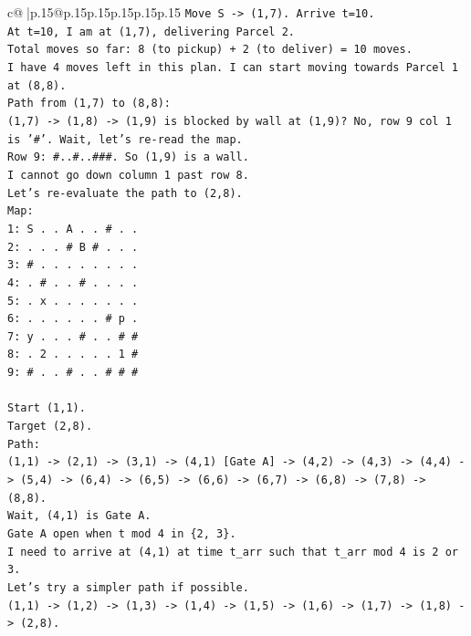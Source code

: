 \documentclass{article}
\begin{document}
{\begin{supertabular}{c@{$\;$}|p{.15\linewidth}@{}p{.15\linewidth}p{.15\linewidth}p{.15\linewidth}p{.15\linewidth}p{.15\linewidth}}
{{{\texttt{Move S {-}> (1,7). Arrive t=10.} \\
\texttt{At t=10, I am at (1,7), delivering Parcel 2.} \\
\texttt{Total moves so far: 8 (to pickup) + 2 (to deliver) = 10 moves.} \\
\texttt{I have 4 moves left in this plan. I can start moving towards Parcel 1 at (8,8).} \\
\texttt{Path from (1,7) to (8,8):} \\
\texttt{(1,7) {-}> (1,8) {-}> (1,9) is blocked by wall at (1,9)? No, row 9 col 1 is '\#'. Wait, let's re{-}read the map.} \\
\texttt{Row 9: \#..\#..\#\#\#. So (1,9) is a wall.} \\
\texttt{I cannot go down column 1 past row 8.} \\
\texttt{Let's re{-}evaluate the path to (2,8).} \\
\texttt{Map:} \\
\texttt{1: S . . A . . \# . .} \\
\texttt{2: . . . \# B \# . . .} \\
\texttt{3: \# . . . . . . . .} \\
\texttt{4: . \# . . \# . . . .} \\
\texttt{5: . x . . . . . . .} \\
\texttt{6: . . . . . . \# p .} \\
\texttt{7: y . . . \# . . \# \#} \\
\texttt{8: . 2 . . . . . 1 \#} \\
\texttt{9: \# . . \# . . \# \# \#} \\
\\ 
\texttt{Start (1,1).} \\
\texttt{Target (2,8).} \\
\texttt{Path:} \\
\texttt{(1,1) {-}> (2,1) {-}> (3,1) {-}> (4,1) {[}Gate A{]} {-}> (4,2) {-}> (4,3) {-}> (4,4) {-}> (5,4) {-}> (6,4) {-}> (6,5) {-}> (6,6) {-}> (6,7) {-}> (6,8) {-}> (7,8) {-}> (8,8).} \\
\texttt{Wait, (4,1) is Gate A.} \\
\texttt{Gate A open when t mod 4 in \{2, 3\}.} \\
\texttt{I need to arrive at (4,1) at time t\_arr such that t\_arr mod 4 is 2 or 3.} \\
\texttt{Let's try a simpler path if possible.} \\
\texttt{(1,1) {-}> (1,2) {-}> (1,3) {-}> (1,4) {-}> (1,5) {-}> (1,6) {-}> (1,7) {-}> (1,8) {-}> (2,8).} \\
}}}
\end{supertabular}}
\end{document}
